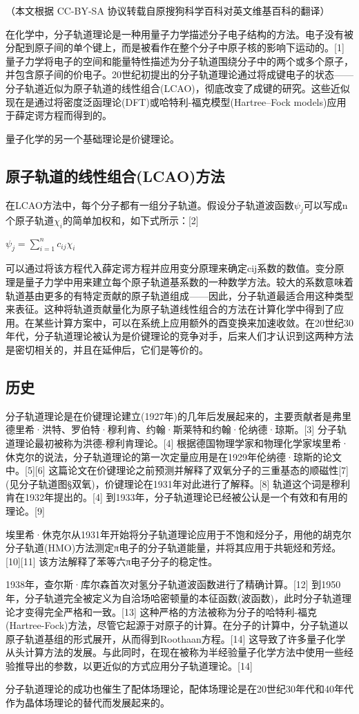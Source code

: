 
（本文根据 CC-BY-SA 协议转载自原搜狗科学百科对英文维基百科的翻译）

在化学中，分子轨道理论是一种用量子力学描述分子电子结构的方法。电子没有被分配到原子间的单个键上，而是被看作在整个分子中原子核的影响下运动的。[1] 量子力学将电子的空间和能量特性描述为分子轨道围绕分子中的两个或多个原子，并包含原子间的价电子。20世纪初提出的分子轨道理论通过将成键电子的状态——分子轨道近似为原子轨道的线性组合(LCAO)，彻底改变了成键的研究。这些近似现在是通过将密度泛函理论(DFT)或哈特利-福克模型(Hartree–Fock models)应用于薛定谔方程而得到的。

量子化学的另一个基础理论是价键理论。

\subsection{原子轨道的线性组合(LCAO)方法}

在LCAO方法中，每个分子都有一组分子轨道。假设分子轨道波函数$\psi_j$可以写成n个原子轨道$\chi_i$的简单加权和，如下式所示：[2]

 $\psi_j = \sum_{i=1}^{n} c_{ij} \chi_i$


可以通过将该方程代入薛定谔方程并应用变分原理来确定cij系数的数值。变分原理是量子力学中用来建立每个原子轨道基系数的一种数学方法。较大的系数意味着轨道基由更多的有特定贡献的原子轨道组成——因此，分子轨道最适合用这种类型来表征。这种将轨道贡献量化为原子轨道线性组合的方法在计算化学中得到了应用。在某些计算方案中，可以在系统上应用额外的酉变换来加速收敛。在20世纪30年代，分子轨道理论被认为是价键理论的竞争对手，后来人们才认识到这两种方法是密切相关的，并且在延伸后，它们是等价的。

\subsection{历史}

分子轨道理论是在价键理论建立(1927年)的几年后发展起来的，主要贡献者是弗里德里希·洪特、罗伯特·穆利肯、约翰·斯莱特和约翰·伦纳德·琼斯。[3] 分子轨道理论最初被称为洪德-穆利肯理论。[4] 根据德国物理学家和物理化学家埃里希·休克尔的说法，分子轨道理论的第一次定量应用是在1929年伦纳德·琼斯的论文中。[5][6] 这篇论文在价键理论之前预测并解释了双氧分子的三重基态的顺磁性[7] (见分子轨道图§双氧)，价键理论在1931年对此进行了解释。[8] 轨道这个词是穆利肯在1932年提出的。[4] 到1933年，分子轨道理论已经被公认是一个有效和有用的理论。[9]

埃里希·休克尔从1931年开始将分子轨道理论应用于不饱和烃分子，用他的胡克尔分子轨道(HMO)方法测定π电子的分子轨道能量，并将其应用于共轭烃和芳烃。[10][11] 该方法解释了苯等六π电子分子的稳定性。

1938年，查尔斯·库尔森首次对氢分子轨道波函数进行了精确计算。[12] 到1950年，分子轨道完全被定义为自洽场哈密顿量的本征函数(波函数)，此时分子轨道理论才变得完全严格和一致。[13] 这种严格的方法被称为分子的哈特利-福克(Hartree-Fock)方法，尽管它起源于对原子的计算。在分子的计算中，分子轨道以原子轨道基组的形式展开，从而得到Roothaan方程。[14] 这导致了许多量子化学从头计算方法的发展。与此同时，在现在被称为半经验量子化学方法中使用一些经验推导出的参数，以更近似的方式应用分子轨道理论。[14]

分子轨道理论的成功也催生了配体场理论，配体场理论是在20世纪30年代和40年代作为晶体场理论的替代而发展起来的。